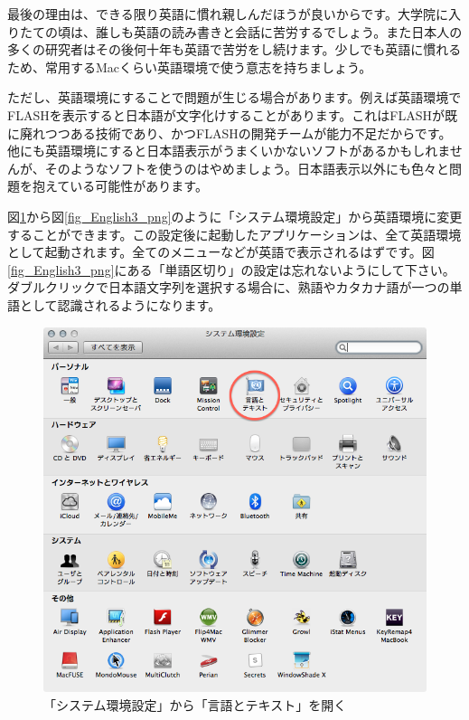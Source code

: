 最後の理由は、できる限り英語に慣れ親しんだほうが良いからです。大学院に入りたての頃は、誰しも英語の読み書きと会話に苦労するでしょう。また日本人の多くの研究者はその後何十年も英語で苦労をし続けます。少しでも英語に慣れるため、常用するMacくらい英語環境で使う意志を持ちましょう。

ただし、英語環境にすることで問題が生じる場合があります。例えば英語環境でFLASHを表示すると日本語が文字化けすることがあります。これはFLASHが既に廃れつつある技術であり、かつFLASHの開発チームが能力不足だからです。他にも英語環境にすると日本語表示がうまくいかないソフトがあるかもしれませんが、そのようなソフトを使うのはやめましょう。日本語表示以外にも色々と問題を抱えている可能性があります。

図\ref{fig_English1_png}から図\ref{fig_English3_png}のように「システム環境設定」から英語環境に変更することができます。この設定後に起動したアプリケーションは、全て英語環境として起動されます。全てのメニューなどが英語で表示されるはずです。図\ref{fig_English3_png}にある「単語区切り」の設定は忘れないようにして下さい。ダブルクリックで日本語文字列を選択する場合に、熟語やカタカナ語が一つの単語として認識されるようになります。

\begin{figure}
  \begin{center}
    \includegraphics[scale=0.35,bb= 0 0 668 636]{fig/English1.png}
    \caption{「システム環境設定」から「言語とテキスト」を開く}
    \label{fig_English1_png}
  \end{center}
\end{figure}

